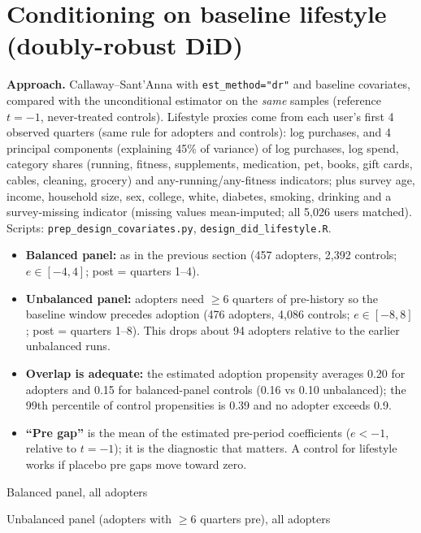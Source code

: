 \documentclass[11pt]{article}
\begin{document}
\section{Conditioning on baseline lifestyle (doubly-robust DiD)}
\textbf{Approach.} Callaway--Sant'Anna with \texttt{est\_method="dr"} and baseline covariates, compared with the unconditional estimator on the \emph{same} samples (reference $t=-1$, never-treated controls). Lifestyle proxies come from each user's first 4 observed quarters (same rule for adopters and controls): log purchases, and 4 principal components (explaining 45\% of variance) of log purchases, log spend, category shares (running, fitness, supplements, medication, pet, books, gift cards, cables, cleaning, grocery) and any-running/any-fitness indicators; plus survey age, income, household size, sex, college, white, diabetes, smoking, drinking and a survey-missing indicator (missing values mean-imputed; all 5{,}026 users matched). Scripts: \texttt{prep\_design\_covariates.py}, \texttt{design\_did\_lifestyle.R}.
\begin{itemize}[nosep]
\item \textbf{Balanced panel:} as in the previous section (457 adopters, 2{,}392 controls; $e\in[-4,4]$; post = quarters 1--4).
\item \textbf{Unbalanced panel:} adopters need $\geq$6 quarters of pre-history so the baseline window precedes adoption (476 adopters, 4{,}086 controls; $e\in[-8,8]$; post = quarters 1--8). This drops about 94 adopters relative to the earlier unbalanced runs.
\item \textbf{Overlap is adequate:} the estimated adoption propensity averages 0.20 for adopters and 0.15 for balanced-panel controls (0.16 vs 0.10 unbalanced); the 99th percentile of control propensities is 0.39 and no adopter exceeds 0.9.
\item \textbf{``Pre gap''} is the mean of the estimated pre-period coefficients ($e<-1$, relative to $t=-1$); it is the diagnostic that matters. A control for lifestyle works if placebo pre gaps move toward zero.
\end{itemize}
\begin{center}\small Balanced panel, all adopters\\[2pt]\end{center}
\begin{center}\small Unbalanced panel (adopters with $\geq$6 quarters pre), all adopters\\[2pt]\end{center}
\end{document}
